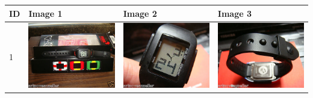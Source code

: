 \begin{longtable}{| l | l | l | l |}
	\hline
	ID & Image 1 & Image 2 & Image 3 \\
	\hline
	\multirow{6}{*}{1} & \includegraphics[scale=0.25]{images/ground_truth/1/image_1} & \includegraphics[scale=0.25]{images/ground_truth/1/image_2} & \includegraphics[scale=0.25]{images/ground_truth/1/image_3} \\

\end{longtable}

